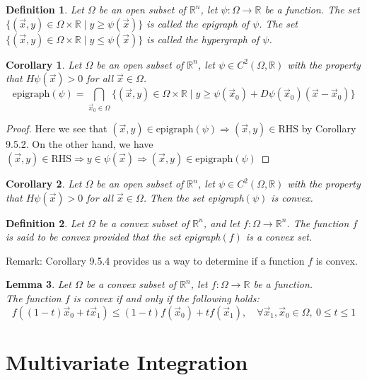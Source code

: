 \documentclass[11pt,oneside]{book}
\theoremstyle{break}
\theoremstyle{break}
\newtheorem{lem}{Lemma}[thm]
\newtheorem{corT}[lem]{Corollary}
\newtheorem{defn}{Definition}[corL]
\newcommand{\R}{\mathbb{R}}
\newcommand{\remark}{\color{blue}Remark: \color{black}}
\begin{document}
\begin{defn}
Let $\Omega$ be an open subset of $\R^n$, let $\psi : \Omega \to \R$ be a function. The set $\{(\vec{x},y) \in \Omega \times \R \mid y \geq \psi(\vec{x})\}$ is called the epigraph of $\psi$. The set $\{(\vec{x},y) \in \Omega \times \R \mid y \leq \psi(\vec{x})\}$ is called the hypergraph of $\psi$.
\end{defn}


\begin{corT}
Let $\Omega$ be an open subset of $\R^n$, let $\psi \in C^2(\Omega, \R)$ with the property that $H\psi(\vec{x})> 0$ for all $\vec{x}\in \Omega$.
$$\text{epigraph}(\psi) = \bigcap_{\vec{x}_0 \in \Omega} \{ (\vec{x},y) \in \Omega \times \R \mid y\geq \psi(\vec{x}_0)+D\psi (\vec{x}_0) (\vec{x}-\vec{x}_0)\}$$
\end{corT}
\begin{proof}
Here we see that $(\vec{x},y) \in \text{epigraph}(\psi) \Rightarrow (\vec{x},y) \in \text{RHS}$ by Corollary 9.5.2. On the other hand, we have $(\vec{x},y) \in \text{RHS} \Rightarrow y \in \psi(\vec{x}) \Rightarrow (\vec{x},y) \in \text{epigraph}(\psi)$
\end{proof}

\begin{corT}
Let $\Omega$ be an open subset of $\R^n$, let $\psi \in C^2(\Omega, \R)$ with the property that $H\psi(\vec{x})> 0$ for all $\vec{x}\in \Omega$. Then the set epigraph$(\psi)$ is convex.
\end{corT}

\begin{defn}
Let $\Omega$ be a convex subset of $\R^n$, and let $f: \Omega \to \R^n$. The function $f$ is said to be convex provided that the set epigraph$(f)$ is a convex set.
\end{defn}

\remark Corollary 9.5.4 provides us a way to determine if a function $f$ is convex.


\begin{lem}
Let $\Omega$ be a convex subset of $\R^n$, let $f : \Omega \to \R$ be a function. \\ The function $f$ is convex if and only if the following holds: 
$$f((1-t)\vec{x}_0 + t\vec{x}_1) \leq (1-t)f(\vec{x}_0) + tf(\vec{x}_1),\quad \forall \vec{x}_1,\vec{x}_0 \in \Omega,\ 0\leq t \leq 1$$
\end{lem}


\newpage
\chapter{Multivariate Integration}
\setcounter{section}{9}
\end{document}

